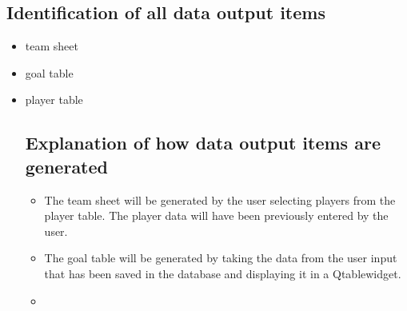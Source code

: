 \subsection{Identification of all data output items}
\begin{itemize}
\item team sheet
\item goal table
\item player table
\subsection{Explanation of how data output items are generated}
\begin{itemize}
\item The team sheet will be generated by the user selecting players from the player table. The player data will have been previously entered by the user. 
\item The goal table will be generated by taking the data from the user input that has been saved in the database and displaying it in a Qtablewidget.
\item 
\end{itemize}

\end{itemize}
